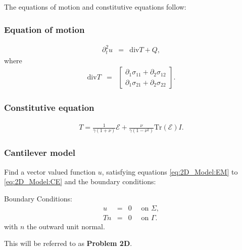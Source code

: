 			The equations of motion and constitutive equations follow:
			\subsubsection*{Equation of motion}\label{sssec:2D_Model:EquationOfMotion}
			\begin{eqnarray}
				\partial_t^2 u & = & \textrm{div}T + Q, \label{eq:2D_Model:EM}
			\end{eqnarray}
			where
			\begin{eqnarray}
				\textrm{div} T & = &
				\begin{bmatrix}
					\partial_1 \sigma_{11} + \partial_2 \sigma_{12} \\
					\partial_1 \sigma_{21} + \partial_2 \sigma_{22}
				\end{bmatrix}. \label{eq:2D_Model:DivT}
			\end{eqnarray}
			\subsubsection*{Constitutive equation}\label{sssec:2D_Model:ConstitutiveEquation}
			\begin{eqnarray}
				T = \frac{1}{\gamma(1+\nu)}\mathcal{E} + \frac{\nu}{\gamma(1-\nu^2)}\textrm{Tr}(\mathcal{E}) I. \label{eq:2D_Model:CE}
			\end{eqnarray}

		\subsubsection*{Cantilever model}

			Find a vector valued function $u$, satisfying equations \eqref{eq:2D_Model:EM} to \eqref{eq:2D_Model:CE} and the boundary conditions:

			Boundary Conditions:
			\begin{eqnarray*}
				u & = & 0 \quad \textrm{ on } \Sigma,\\
				Tn & = & 0 \quad \textrm{ on } \Gamma.
			\end{eqnarray*} with $n$ the outward unit normal.

			This will be referred to as \textbf{Problem 2D}.

